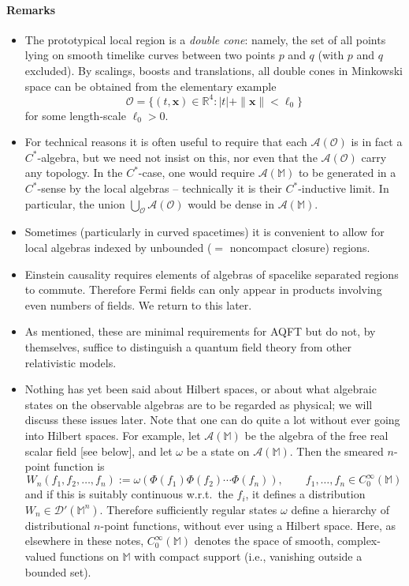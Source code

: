 \documentclass[12pt,a4paper]{article}
\newcommand{\1}{\mathds{1}}                         %
\newcommand{\RR}{\mathbb{R}}           %
\newcommand{\Ocal}{\mathcal{O}}
\newcommand{\MM}{\mathbb{M}}
\newcommand{\DD}{{\mathscr{D}}}
\newcommand{\xb}{{\boldsymbol{x}}}
\newcommand{\Ac}{{\mathcal{A}}}
\newcommand{\CoinX}[1]{C_0^\infty(#1)}
\begin{document}
	\paragraph{Remarks}
	\begin{itemize}
	\item The prototypical local region is a \emph{double cone}: namely, the set of all points
	lying on smooth timelike curves between two points $p$ and $q$ (with $p$ and $q$ excluded). By scalings, boosts and translations, all double cones in Minkowski space can be obtained from the elementary example
	\[
	\Ocal = \{(t,\xb)\in\RR^4: |t|+\|\xb\| < \ell_0 \}
	\]
	for some length-scale $\ell_0>0$.  
	\item For technical reasons it is often useful to require that each $\Ac(\Ocal)$ is in fact a $C^*$-algebra, but we need not insist on this, nor even that the $\Ac(\Ocal)$ carry any topology. In the $C^*$-case, one would require $\Ac(\MM)$ to be generated in a $C^*$-sense by the local algebras -- technically it is their $C^*$-inductive limit. In particular, the union $\bigcup_{\Ocal}\Ac(\Ocal)$ would be dense in $\Ac(\MM)$. 	
	\item Sometimes (particularly in curved spacetimes) it is convenient to allow for local algebras indexed by unbounded ($=$ noncompact closure) regions. 
 
	\item Einstein causality requires elements of algebras of spacelike separated regions to commute. Therefore Fermi fields can only appear in products involving even numbers of fields. We return to this later.	
	\item As mentioned, these are minimal requirements for AQFT but do not, by themselves, suffice to distinguish a quantum field theory from other relativistic models. 
	\item Nothing has yet been said about Hilbert spaces, or about what algebraic states on the observable algebras are to be regarded as physical; we will discuss these issues later. Note that one can do quite a lot without ever going into Hilbert spaces. For example, 
		let $\Ac(\MM)$ be the algebra of the free real scalar field [see below], and let $\omega$ be a state on $\Ac(\MM)$. Then the smeared $n$-point function is
		\[
		W_n(f_1,f_2,\ldots,f_n) := \omega(\Phi(f_1)\Phi(f_2)\cdots \Phi(f_n)), \qquad f_1,\ldots,f_n\in\CoinX{\MM}
		\]
		and if this is suitably continuous w.r.t.\ the $f_i$, it defines a distribution $W_n\in\DD'(\MM^n)$. 
		Therefore sufficiently regular states $\omega$ define a hierarchy of distributional $n$-point functions, without ever using a Hilbert space. Here, as elsewhere in these notes, $\CoinX{\MM}$ denotes the space of smooth, complex-valued functions on $\MM$ with compact support (i.e., vanishing outside a bounded set).
	\end{itemize}
	
\end{document}
